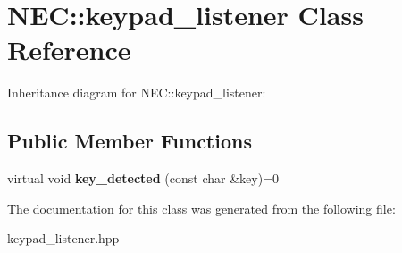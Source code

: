 \hypertarget{classNEC_1_1keypad__listener}{}\section{N\+EC\+:\+:keypad\+\_\+listener Class Reference}
\label{classNEC_1_1keypad__listener}


Inheritance diagram for N\+EC\+:\+:keypad\+\_\+listener\+:
\subsection*{Public Member Functions}
\begin{DoxyCompactItemize}
\item 
\mbox{\label{classNEC_1_1keypad__listener_a8e80336ea1ce774564e4ea50d7b814a7}} 
virtual void {\bfseries key\+\_\+detected} (const char \&key)=0
\end{DoxyCompactItemize}


The documentation for this class was generated from the following file\+:\begin{DoxyCompactItemize}
\item 
keypad\+\_\+listener.\+hpp\end{DoxyCompactItemize}
